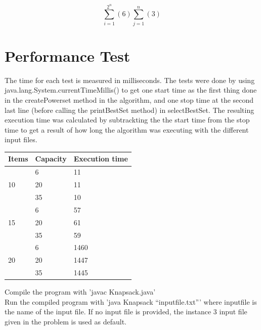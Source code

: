 \documentclass{inc/mas}
\begin{document}
\begin{equation}
\sum^{2^n}_{i=1}(6)\sum^n_{j=1}(3)
\end{equation}


\section{Performance Test}

The time for each test is measured in milliseconds. The tests were done by using java.lang.System.currentTimeMillis() to get one start time as the first thing done in the createPowerset method in the algorithm, and one stop time at the second last line (before calling the printBestSet method) in selectBestSet. The resulting execution time was calculated by subtrackting the the start time from the stop time to get a result of how long the algorithm was executing with the different input files.\\

\begin{tabular}{|l|l|l|} \hline
Items &Capacity &Execution time\\ \hline
\multirow{3}{*}{10} & 6 & 11 \\
& 20 & 11 \\
& 35 & 10 \\ \hline
\multirow{3}{*}{15} & 6 & 57 \\
& 20 & 61 \\
& 35 & 59 \\ \hline
\multirow{3}{*}{20} & 6 & 1460 \\
& 20 & 1447 \\
& 35 & 1445 \\ \hline
\end{tabular}

\noindent Compile the program with 'javac Knapsack.java'\\ 
\noindent Run the compiled program with 'java Knapsack ``inputfile.txt''' where inputfile is the name of the input file. If no input file is provided, the instance 3 input file given in the problem is used as default. 




%
\end{document}
